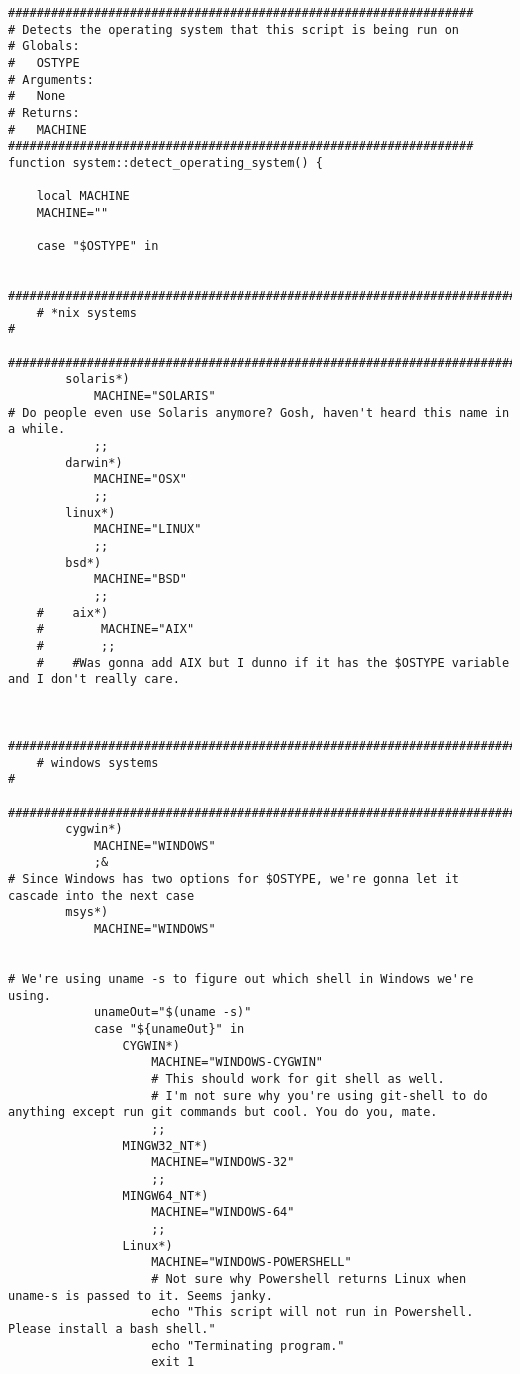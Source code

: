\documentclass[11pt]{article}
\begin{document}
\begin{verbatim}
#################################################################
# Detects the operating system that this script is being run on
# Globals:
#   OSTYPE
# Arguments:
#   None
# Returns:
#   MACHINE
#################################################################
function system::detect_operating_system() {

    local MACHINE
    MACHINE=""

    case "$OSTYPE" in

    #########################################################################
    # *nix systems                                                          #
    #########################################################################
        solaris*)
            MACHINE="SOLARIS"                                                     # Do people even use Solaris anymore? Gosh, haven't heard this name in a while.
            ;;
        darwin*)
            MACHINE="OSX"
            ;;
        linux*)
            MACHINE="LINUX"
            ;;
        bsd*)
            MACHINE="BSD"
            ;;
    #    aix*)
    #        MACHINE="AIX"
    #        ;;
    #    #Was gonna add AIX but I dunno if it has the $OSTYPE variable and I don't really care.


    #########################################################################
    # windows systems                                                       #
    #########################################################################
        cygwin*)
            MACHINE="WINDOWS"
            ;&                                                                    # Since Windows has two options for $OSTYPE, we're gonna let it cascade into the next case
        msys*)
            MACHINE="WINDOWS"

                                                                                  # We're using uname -s to figure out which shell in Windows we're using.
            unameOut="$(uname -s)"
            case "${unameOut}" in
                CYGWIN*)
                    MACHINE="WINDOWS-CYGWIN"
                    # This should work for git shell as well.
                    # I'm not sure why you're using git-shell to do anything except run git commands but cool. You do you, mate.
                    ;;
                MINGW32_NT*)
                    MACHINE="WINDOWS-32"
                    ;;
                MINGW64_NT*)
                    MACHINE="WINDOWS-64"
                    ;;
                Linux*)
                    MACHINE="WINDOWS-POWERSHELL"
                    # Not sure why Powershell returns Linux when uname-s is passed to it. Seems janky.
                    echo "This script will not run in Powershell. Please install a bash shell."
                    echo "Terminating program."
                    exit 1


\end{verbatim}
\end{document}
